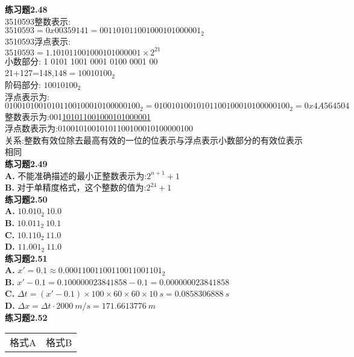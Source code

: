 \documentclass{article}
\begin{document}
\begin{CJK}{UTF8}{uyhei}
\textbf{练习题2.48}	\\[2ex]
3510593整数表示:	\\
$3510593=0x00359141=0011 0101 1001 0001 0100 0001_2$	\\[2ex]
3510593浮点表示:	\\
$3510593=1.1 0101 1001 0001 0100 0001\times 2^{21}$	\\
小数部分: 1 0101 1001 0001 0100 0001 00	\\[2ex]
21+127=148,$148=1001 0100_2$	\\
阶码部分: $10010100_2$	\\[2ex]
浮点表示为: $0 10010100 1 0101 1001 0001 0100 0001 00_2=0100 1010 0101 0110 0100 0101 0000 0100_2=0x4A564504$	\\
整数表示为:\hspace{4em}001\underline{101011001000101000001}	\\
浮点数表示为:01001010010101100100010100000100	\\
关系:整数有效位除去最高有效的一位的位表示与浮点表示小数部分的有效位表示相同	\\[3ex]
\textbf{练习题2.49}	\\[2ex]
\textbf{A.} 不能准确描述的最小正整数表示为:$2^{n+1}+1$	\\
\textbf{B.} 对于单精度格式，这个整数的值为:$2^{24}+1$	\\[3ex]
\textbf{练习题2.50}	\\[2ex]
\textbf{A.} $10.010_2\ 10.0$	\\
\textbf{B.} $10.011_2\ 10.1$	\\
\textbf{C.} $10.110_2\ 11.0$	\\
\textbf{D.} $11.001_2\ 11.0$	\\[2ex]
\textbf{练习题2.51}	\\[2ex]
\textbf{A.} $x'=0.1\approx 0.00011001100110011001101_2$	\\
\textbf{B.} $x'-0.1=0.100000023841858-0.1=0.000000023841858$	\\
\textbf{C.} $\Delta t=(x'-0.1)\times 100\times 60\times 60\times 10\ s=0.0858306888\ s$	\\
\textbf{D.} $\Delta x=\Delta t \cdot 2000\ m/s=171.6613776\ m$	\\[2ex]
\textbf{练习题2.52}
\begin{table}[htbp]
\centering
\begin{tabular}{|m{5em}<{\centering}|m{5em}<{\centering}|m{5em}<{\centering}|m{5em}<{\centering}|}
	\hline
	\multicolumn{2}{|c|}{格式A}	&	\multicolumn{2}{c|}{格式B}	\\

\end{tabular}
\end{table}
\end{CJK}
\end{document}
